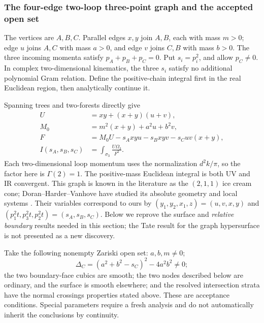 \documentclass[11pt,a4paper,oneside]{article}
\theoremstyle{plain}
\theoremstyle{definition}
\theoremstyle{remark}
\numberwithin{equation}{section}
\begin{document}
\subsubsection{The four-edge two-loop three-point graph and the accepted open set}
The vertices are $A,B,C$. Parallel edges $x,y$ join $A,B$, each with mass $m>0$;
edge $u$ joins $A,C$ with mass $a>0$, and edge $v$ joins $C,B$ with mass $b>0$.
The three incoming momenta satisfy $p_A+p_B+p_C=0$. Put $s_i=p_i^2$,
and allow $p_C\ne0$. In complex two-dimensional kinematics, the three $s_i$ satisfy no additional polynomial Gram relation.
Define the positive-chain integral first in the real Euclidean region, then analytically continue it.

Spanning trees and two-forests directly give
\begin{align}
 U&=xy+(x+y)(u+v),\\
 M_0&=m^2(x+y)+a^2u+b^2v,\\
 F&=M_0U-s_Axyu-s_Bxyv-s_Cuv(x+y),\\
 I(s_A,s_B,s_C)&=\int_{\sigma_3}\frac{U\Omega_3}{F^2}.
 \label{unified:eq:injectedgraph}
\end{align}
Each two-dimensional loop momentum uses the normalization $d^2k/\pi$, so the factor here is $\Gamma(2)=1$.
The positive-mass Euclidean integral is both UV and IR convergent. This graph is known in the literature as the $(2,1,1)$ ice cream cone;
Doran--Harder--Vanhove have studied its absolute geometry and local systems
\cite[\S7.3, equations (120)--(121), Proposition7.6]{dhv2023}.
Their variables correspond to ours by $(y_1,y_2,x_1,z)=(u,v,x,y)$ and
$(p_1^2t,p_3^2t,p_2^2t)=(s_A,s_B,s_C)$.
Below we reprove the surface and \emph{relative boundary} results needed in this section;
the Tate result for the graph hypersurface is not presented as a new discovery.

Take the following nonempty Zariski open set: $a,b,m\ne0$;
\begin{equation}\label{unified:eq:injecteddiscriminant}
 \Delta_C=(a^2+b^2-s_C)^2-4a^2b^2\ne0;
\end{equation}
the two boundary-face cubics are smooth; the two nodes described below are ordinary, and the surface is smooth elsewhere;
and the resolved intersection strata have the normal crossings properties stated above.
These are acceptance conditions. Special parameters require a fresh analysis and do not automatically inherit the conclusions by continuity.
\end{document}
